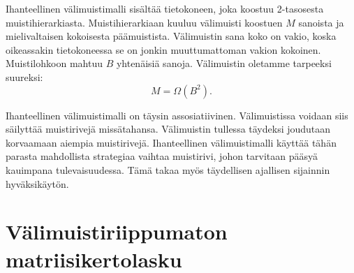 \documentclass[finnish]{tktltiki2}
\theoremstyle{definition}
\theoremstyle{remark}
\begin{document}
Ihanteellinen välimuistimalli sisältää
tietokoneen, joka koostuu 2-tasosesta muistihierarkiasta. Muistihierarkiaan
kuuluu välimuisti koostuen $ M $ sanoista ja mielivaltaisen
kokoisesta päämuistista. Välimuistin sana koko on
vakio, koska oikeassakin tietokoneessa se on jonkin muuttumattoman vakion kokoinen.
Muistilohkoon mahtuu $ B $ yhtenäisiä sanoja. Välimuistin oletamme tarpeeksi suureksi:
\[
M=\Omega(B^2).
\]

Ihanteellinen välimuistimalli on täysin assosiatiivinen.
Välimuistissa voidaan siis säilyttää muistirivejä missätahansa.
Välimuistin tullessa täydeksi joudutaan korvaamaan aiempia muistirivejä.
Ihanteellinen välimuistimalli käyttää tähän parasta mahdollista strategiaa
vaihtaa muistirivi, johon tarvitaan pääsyä kauimpana tulevaisuudessa.
Tämä takaa myös täydellisen ajallisen sijainnin hyväksikäytön.

















\section{Välimuistiriippumaton matriisikertolasku}


%
%
% 
%



\end{document}
